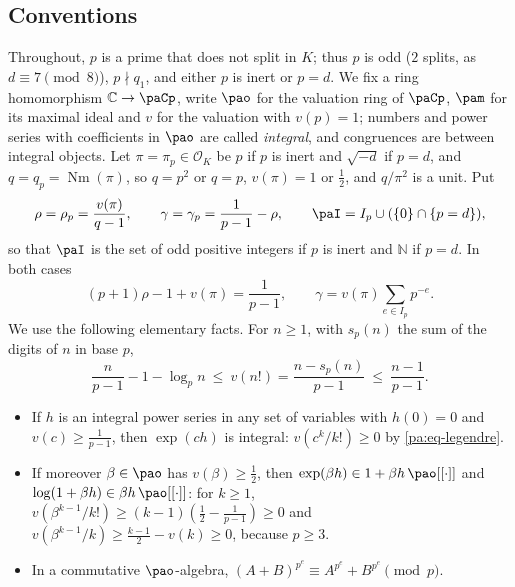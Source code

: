 \documentclass[10pt]{amsart}
\theoremstyle{definition}
\theoremstyle{remark}
\newcommand{\C}{\mathbb C}
\newcommand{\N}{\mathbb N}
\providecommand{\auNm}{\operatorname{Nm}}
\providecommand{\auO}{\mathcal O}
\begin{document}
\subsection{Conventions}\label{pa:ss-conv}
Throughout, $p$ is a prime that does not split in $K$; thus $p$ is odd ($2$ splits, as
$d\equiv7\pmod 8$), $p\nmid q_1$, and either $p$ is inert or $p=d$. We fix a ring homomorphism
$\C\to\paCp$, write $\pao$ for the valuation ring of $\paCp$, $\pam$ for its maximal ideal and $v$
for the valuation with $v(p)=1$; numbers and power series with coefficients in $\pao$ are called
\emph{integral}, and congruences are between integral objects. Let $\pi=\pi_p\in\auO_K$ be $p$ if
$p$ is inert and $\sqrt{-d}$ if $p=d$, and $q=q_p=\auNm(\pi)$, so $q=p^2$ or $q=p$, $v(\pi)=1$ or
$\tfrac12$, and $q/\pi^2$ is a unit. Put
\[
\rho=\rho_p=\frac{v(\pi)}{q-1},\qquad\gamma=\gamma_p=\frac1{p-1}-\rho,\qquad
\paI=I_p\cup(\{0\}\cap\{p=d\}),
\]
so that $\paI$ is the set of odd positive integers if $p$ is inert and $\N$ if $p=d$. In both
cases
\begin{equation}\label{pa:eq-const}
(p+1)\rho-1+v(\pi)=\frac1{p-1},\qquad\gamma=v(\pi)\sum_{e\in I_p}p^{-e}.
\end{equation}
We use the following elementary facts. For $n\ge1$, with $s_p(n)$ the sum of the digits of $n$ in
base $p$,
\begin{equation}\label{pa:eq-legendre}
\frac n{p-1}-1-\log_pn\ \le\ v(n!)=\frac{n-s_p(n)}{p-1}\ \le\ \frac{n-1}{p-1}.
\end{equation}
\begin{itemize}
\item[(E1)] If $h$ is an integral power series in any set of variables with $h(0)=0$ and
$v(c)\ge\frac1{p-1}$, then $\exp(ch)$ is integral: $v(c^k/k!)\ge0$ by \eqref{pa:eq-legendre}.
\item[(E2)] If moreover $\beta\in\pao$ has $v(\beta)\ge\tfrac12$, then
$\exp(\beta h)\in1+\beta h\,\pao[[\cdot]]$ and $\log(1+\beta h)\in\beta h\,\pao[[\cdot]]$: for
$k\ge1$, $v(\beta^{k-1}/k!)\ge(k-1)(\tfrac12-\tfrac1{p-1})\ge0$ and
$v(\beta^{k-1}/k)\ge\tfrac{k-1}2-v(k)\ge0$, because $p\ge3$.
\item[(E3)] In a commutative $\pao$-algebra, $(A+B)^{p^e}\equiv A^{p^e}+B^{p^e}\pmod p$.
\end{itemize}
\end{document}
